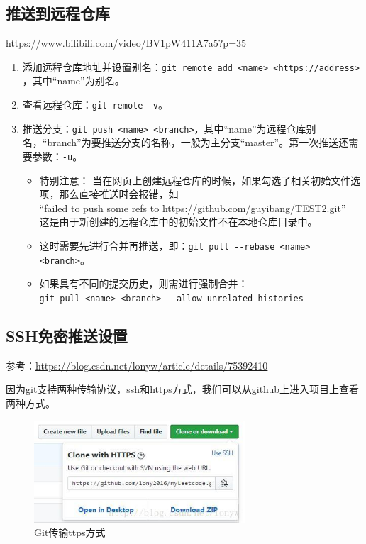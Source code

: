 \subsection{推送到远程仓库}
\url{https://www.bilibili.com/video/BV1pW411A7a5?p=35}
\begin{enumerate}
\item 添加远程仓库地址并设置别名：\verb|git remote add <name> <https://address> |，其中“name”为别名。
\item 查看远程仓库：\verb|git remote -v|。
\item 推送分支：\verb|git push <name> <branch>|，其中“name”为远程仓库别名，“branch”为要推送分支的名称，一般为主分支“master”。第一次推送还需要参数：\verb|-u|。
\begin{itemize}
\item 特别注意： 当在网页上创建远程仓库的时候，如果勾选了相关初始文件选项，那么直接推送时会报错，如\\
“failed to push some refs to https://github.com/guyibang/TEST2.git”\\
这是由于新创建的远程仓库中的初始文件不在本地仓库目录中。
\item 这时需要先进行合并再推送，即：\verb|git pull --rebase <name> <branch>|。
\item 如果具有不同的提交历史，则需进行强制合并：\\ 
\verb|git pull <name> <branch> --allow-unrelated-histories |
\end{itemize}
\end{enumerate}




\subsection{SSH免密推送设置}
参考：\url{https://blog.csdn.net/lonyw/article/details/75392410}

因为git支持两种传输协议，ssh和https方式，我们可以从github上进入项目上查看两种方式。
\begin{figure}[h!]
\centering
\includegraphics[width=0.7\textwidth]{pictures/20170719225827865.jpeg}
\caption{Git传输ttps方式}
\end{figure}

